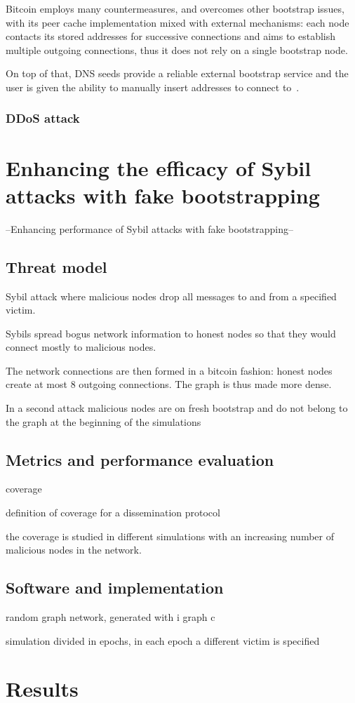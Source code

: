 \documentclass[12pt, letterpaper, twoside]{article}
\begin{document}
Bitcoin employs many countermeasures, and overcomes other bootstrap issues, with its peer cache implementation mixed with external mechanisms: each node contacts its stored addresses for successive connections and aims to establish multiple outgoing connections, thus it does not rely on a single bootstrap node.

On top of that, DNS seeds provide a reliable external bootstrap service and the user is given the ability to manually insert addresses to connect to~\cite{mahmoud_netsec_boot}.


\subsubsection{DDoS attack}\label{sec:ddos}



\section{Enhancing the efficacy of Sybil attacks with fake bootstrapping}\label{sec:atk}
--Enhancing performance of Sybil attacks with fake bootstrapping--

\subsection{Threat model}
Sybil attack where malicious nodes drop all messages to and from a specified victim.

Sybils spread bogus network information to honest nodes so that they would connect mostly to malicious nodes.

The network connections are then formed in a bitcoin fashion: honest nodes create at most 8 outgoing connections. The graph is thus made more dense. 

In a second attack malicious nodes are on fresh bootstrap and do not belong to the graph at the beginning of the simulations

\subsection{Metrics and performance evaluation}
coverage

definition of coverage for a dissemination protocol

the coverage is studied in different simulations with an increasing number of malicious nodes in the network.

\subsection{Software and implementation}
random graph network, generated with i graph c

simulation divided in epochs, in each epoch a different victim is specified




\section{Results}\label{sec:res}














\end{document}
